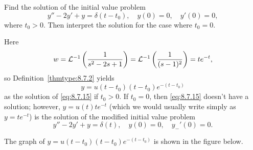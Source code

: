 \documentclass{ximera}
\begin{document}
\begin{example}\label{example:8.7.1}  Find the solution of the initial
value problem
\begin{equation} \label{eq:8.7.15}
y''-2y'+y=\delta(t-t_0), \quad  y(0)=0,\quad y'(0)=0,
\end{equation}
where $t_0>0$. Then interpret the solution for the case where $t_0=0$.
\begin{explanation}
Here
$$
w={\cal L}^{-1}\left(\frac{1}{s^2-2s+1}\right)={\cal L}^{-1}\left(
\frac{1}{(s-1)^2}\right)=te^{-t},
$$
so  Definition~\ref{thmtype:8.7.2} yields
$$
y=u(t-t_0)(t-t_0)e^{-(t-t_0)}
$$
as the solution of  \eqref{eq:8.7.15} if $t_0>0$. If $t_0=0$,
then \eqref{eq:8.7.15} doesn't have a solution; however,
$y=u(t)te^{-t}$
(which we would usually write simply as $y=te^{-t}$) is the solution
of the modified initial value problem
$$
y''-2y'+y=\delta(t), \quad  y(0)=0,\quad y_-'(0)=0.
$$

The graph of $y=u(t-t_0)(t-t_0)e^{-(t-t_0)}$ is shown in
the figure below.  %
\begin{center}
\end{center}

\end{explanation}
\end{example}




\end{document}
